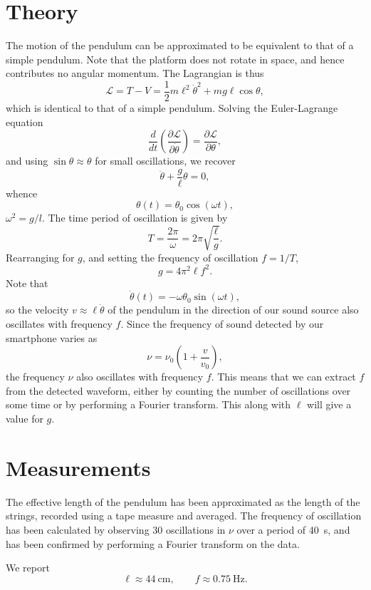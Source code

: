 \documentclass[11pt]{article}
\newcommand\dd[2]{\frac{d #1}{d #2}}
\newcommand\pp[2]{\frac{\partial #1}{\partial #2}}
\begin{document}
    \section{Theory}
    The motion of the pendulum can be approximated to be equivalent to that of a
    simple pendulum. Note that the platform does not rotate in space, and hence
    contributes no angular momentum. The Lagrangian is thus \[
        \mathcal{L} = T - V = \frac{1}{2}m\ell^2\dot{\theta}^2 + mg\ell\cos\theta,
    \] which is identical to that of a simple pendulum. Solving the Euler-Lagrange
    equation \[
        \dd{}{t}\left(\pp{\mathcal{L}}{\dot{\theta}}\right) =
        \pp{\mathcal{L}}{\theta},
    \] and using $\sin\theta \approx \theta$ for small oscillations, we recover \[
        \ddot{\theta} + \frac{g}{\ell}\theta = 0,
    \] whence \[
        \theta(t) = \theta_0 \cos(\omega t),
    \] $\omega^2 = g / l$. The time period of oscillation is given by \[
        T = \frac{2\pi}{\omega} = 2\pi \sqrt{\frac{\ell}{g}}.
    \] Rearranging for $g$, and setting the frequency of oscillation $f = 1 / T$, \[
        g = 4\pi^2 \ell f^2. \tag{\star}
    \] 
    Note that \[
        \dot{\theta}(t) = -\omega\theta_0\sin(\omega t),
    \] so the velocity $v \approx \ell\dot{\theta}$ of the pendulum in the direction
    of our sound source also oscillates with frequency $f$. Since the frequency of
    sound detected by our smartphone varies as \[
        \nu = \nu_0\left(1 + \frac{v}{v_0}\right),
    \] the frequency $\nu$ also oscillates with frequency $f$. This means that we
    can extract $f$ from the detected waveform, either by counting the number of
    oscillations over some time or by performing a Fourier transform. This along
    with $\ell$ will give a value for $g$.


    \section{Measurements}
    The effective length of the pendulum has been approximated as the length of the
    strings, recorded using a tape measure and averaged.
    The frequency of oscillation has been calculated by observing 30 oscillations in
    $\nu$ over a period of \SI{40}{\s}, and has been confirmed by performing a
    Fourier transform on the data.

    We report \[
        \ell \approx \SI{44}{\cm}, \qquad
        f \approx \SI{0.75}{\Hz}.
    \] 
    
\end{document}
